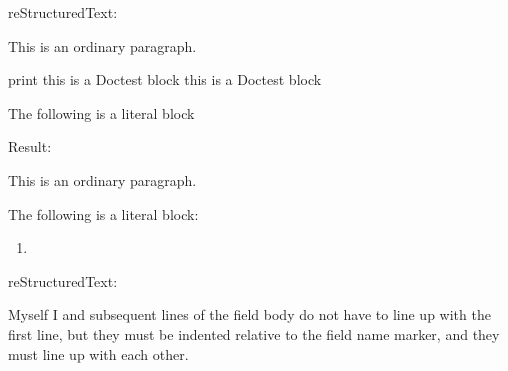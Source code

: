 \documentclass[letterpaper,12pt,english]{sphinxmanual}
\begin{document}
reStructuredText:

\begin{sphinxVerbatim}[commandchars=\\\{\}]
This is an ordinary paragraph.

\PYGZgt{}\PYGZgt{}\PYGZgt{} print \PYGZsq{}this is a Doctest block\PYGZsq{}
this is a Doctest block

The following is a literal block

\end{sphinxVerbatim}

Result:

This is an ordinary paragraph.

\begin{sphinxVerbatim}[commandchars=\\\{\}]
 
\end{sphinxVerbatim}

The following is a literal block:

\begin{sphinxVerbatim}[commandchars=\\\{\}]
        
\end{sphinxVerbatim}
\begin{enumerate}
\def\theenumi{\arabic{enumi}}
\def\labelenumi{\theenumi .}
\makeatletter\def\p@enumii{\p@enumi \theenumi .}\makeatother
\setcounter{enumi}{2}
\item {} 

\end{enumerate}

reStructuredText:

\begin{sphinxVerbatim}[commandchars=\\\{\}]
 
 
 
           Myself
           I
 
   and subsequent lines of the field body do not have to line up
   with the first line, but they must be indented relative to the
   field name marker, and they must line up with each other.
 
\end{sphinxVerbatim}
\end{document}
